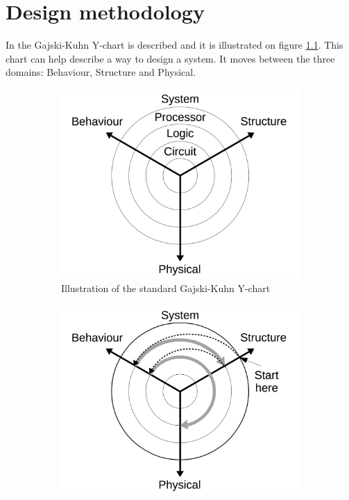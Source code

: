 \chapter{Design methodology} \label{ch:designmet}
In \cite{gajski2009} the Gajski-Kuhn Y-chart is described and it is illustrated on figure \ref{fig:ychart_std}. This chart can help describe a way to design a system. It moves between the three domains: Behaviour, Structure and Physical.
\begin{figure}[ht]
  \centering
  \begin{subfigure}[t]{0.475\textwidth}
    \centering\includegraphics[width=\textwidth]{figures/ychart-std.jpg}
    \caption{Illustration of the standard Gajski-Kuhn Y-chart \cite{gajski2009}\label{fig:ychart_std}}
  \end{subfigure}\hspace{0.25cm}
  \begin{subfigure}[t]{0.475\textwidth}
    \centering\includegraphics[width=\textwidth]{figures/ychart-fpga.jpg}

\end{subfigure}
\end{figure}
